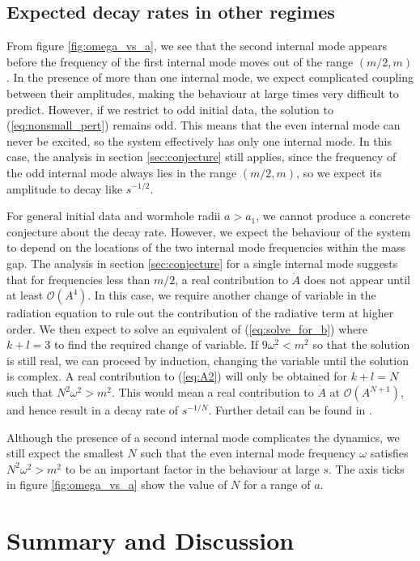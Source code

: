 \subsection{Expected decay rates in other regimes}
From figure \ref{fig:omega_vs_a}, we see that the second internal mode appears before the frequency of the first internal mode moves out of the range $(m/2,m)$. In the presence of more than one internal mode, we expect complicated coupling between their amplitudes, making the behaviour at large times very difficult to predict. However, if we restrict to odd initial data, the solution to (\ref{eq:nonsmall_pert}) remains odd. This means that the even internal mode can never be excited, so the system effectively has only one internal mode. In this case, the analysis in section \ref{sec:conjecture} still applies, since the frequency of the odd internal mode always lies in the range $(m/2,m)$, so we expect its amplitude to decay like $s^{-1/2}$.

For general initial data and wormhole radii $a>a_1$, we cannot produce a concrete conjecture about the decay rate. However, we expect the behaviour of the system to depend on the locations of the two internal mode frequencies within the mass gap. The analysis in section \ref{sec:conjecture} for a single internal mode suggests that for frequencies less than $m/2$, a real contribution to $\dot{A}$ does not appear until at least $\mathcal{O}(A^4)$. In this case, we require another change of variable in the radiation equation to rule out the contribution of the radiative term at higher order. We then expect to solve an equivalent of (\ref{eq:solve_for_b}) where $k+l=3$ to find the required change of variable. If $9\omega^2<m^2$ so that the solution is still real, we can proceed by induction, changing the variable until the solution is complex. A real contribution to (\ref{eq:A2}) will only be obtained for $k+l=N$ such that $N^2\omega^2>m^2$. This would mean a real contribution to $\dot{A}$ at $\mathcal{O}(A^{N+1})$, and hence result in a decay rate of $s^{-1/N}$. Further detail can be found in \cite{SG}.

Although the presence of a second internal mode complicates the dynamics, we still expect the smallest $N$ such that the even internal mode frequency $\omega$ satisfies $N^2\omega^2>m^2$ to be an important factor in the behaviour at large $s$. The axis ticks in figure \ref{fig:omega_vs_a} show the value of $N$ for a range of $a$.

\section{Summary and Discussion}

